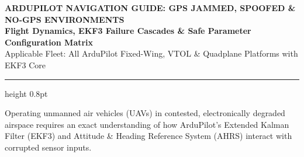 \documentclass[10pt,letterpaper]{article}
\begin{document}
\begin{center}
{\Large\bfseries\color{aeroblue} ARDUPILOT NAVIGATION GUIDE: GPS JAMMED, SPOOFED \& NO-GPS ENVIRONMENTS}\\[1.5mm]
{\normalsize\bfseries Flight Dynamics, EKF3 Failure Cascades \& Safe Parameter Configuration Matrix}\\[1mm]
{\footnotesize\color{gray} Applicable Fleet: All ArduPilot Fixed-Wing, VTOL \& Quadplane Platforms with EKF3 Core}
\end{center}
\vspace{-1.5mm}
\hrule height 0.8pt
\vspace{2.5mm}


Operating unmanned air vehicles (UAVs) in contested, electronically degraded airspace requires an exact understanding of how ArduPilot's Extended Kalman Filter (EKF3) and Attitude \& Heading Reference System (AHRS) interact with corrupted sensor inputs.
\end{document}
